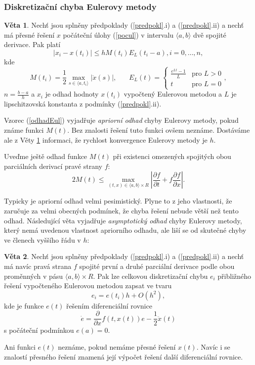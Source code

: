 \documentclass[a4paper, 12pt]{book}
\theoremstyle{definition}
\newtheorem{theorem}{Věta}[section]
\begin{document}
\subsubsection{Diskretizační chyba Eulerovy metody}
\begin{theorem}\label{Veta2.2}
Nechť jsou splněny předpoklady (\ref{predpokl}.i) a (\ref{predpokl}.ii) a nechť
má přesné řešení $x$ počáteční úlohy (\ref{pocul}) v intervalu $\langle a,b\rangle$ 
dvě spojité derivace. Pak platí
\begin{equation}\label{odhadEul}
|x_i-x(t_i)| \leq h M(t_i) E_L(t_i-a), i=0,\dots,n,
\end{equation}
kde 
\begin{displaymath}
M(t_i) = \frac 12 \max_{s\in\langle a,t_i\rangle} |\ddot x(s)|, ~~~~~~~~
E_L(t)=\left\{\begin{array}{ll}\frac{e^{Lt}-1}{L}&\mbox{pro } L>0\\ t&\mbox{pro } L=0
\end{array}\right. ,
\end{displaymath}
$n=\frac {b-a}h$ a $x_i$ je odhad hodnoty $x(t_i)$ vypočtený Eulerovou metodou a $L$ je 
lipschitzovská konstanta z podmínky (\ref{predpokl}.ii).
\end{theorem}
Vzorec (\ref{odhadEul}) vyjadřuje {\em apriorní odhad} chyby Eulerovy metody, 
pokud známe funkci $M(t)$. Bez znalosti řešení tuto funkci ovšem neznáme. 
Dostáváme ale z Věty \ref{Veta2.2} informaci, že rychlost konvergence Eulerovy 
metody je $h$.

Uveďme ještě odhad funkce $M(t)$ při existenci omezených spojitých obou 
parciálních derivací pravé strany $f$:
\begin{displaymath}
2M(t)\leq \max_{(t,x)\in \langle a,b\rangle\times R}\left|\frac{\partial f}{\partial t}+ 
f\frac{\partial f}{\partial x}\right|.
\end{displaymath}

Typicky je apriorní odhad velmi pesimistický. Plyne to z jeho vlastnosti, že 
zaručuje za velmi obecných podmínek, že chyba řešení nebude větší než tento odhad.
Následující věta vyjadřuje {\em asymptotický odhad} chyby Eulerovy metody, který 
nemá uvedenou vlastnost apriorního odhadu, ale liší se od skutečné chyby ve členech
vyššího řádu v $h$:
\begin{theorem}\label{Veta2.4}
Nechť jsou splněny předpoklady (\ref{predpokl}.i) a (\ref{predpokl}.ii) a nechť
má navíc pravá strana $f$ spojité první a druhé parciální derivace podle obou 
proměnných v pásu $\langle a,b\rangle\times R$. Pak lze celkovou diskretizační 
chybu $e_i$ přibližného řešení vypočteného Eulerovou metodou zapsat ve tvaru
\begin{equation}\label{asympEul}
e_i=e(t_i)h+O(h^2),
\end{equation}
kde je funkce $e(t)$ řešením diferenciální rovnice
\begin{displaymath}
\dot e=\frac{\partial}{\partial x}f(t,x(t))e-\frac 12\ddot x(t)
\end{displaymath}
s počáteční podmínkou $e(a)=0$.
\end{theorem}
Ani funkci $e(t)$ neznáme, pokud nemáme přesné řešení $x(t)$. Navíc i se
znalostí přesného řešení znamená její výpočet řešení další diferenciální
rovnice.
\end{document}
